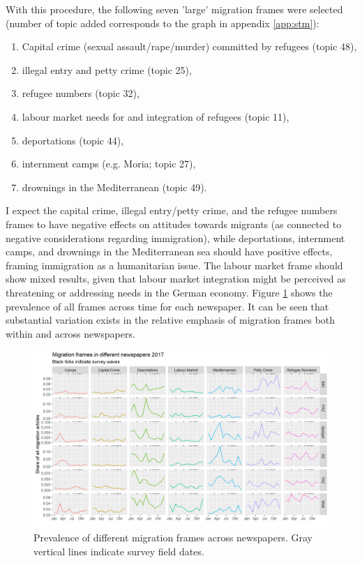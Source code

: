 \documentclass{article}
\begin{document}
With this procedure, the following seven 'large' migration frames were selected (number of topic added corresponds to the graph in appendix \ref{app:stm}):

\begin{enumerate}
    \item Capital crime (sexual assault/rape/murder) committed by refugees (topic 48), 
    \item illegal entry and petty crime (topic 25),
    \item refugee numbers (topic 32),
    \item labour market needs for and integration of refugees (topic 11),
    \item deportations (topic 44),
    \item internment camps (e.g. Moria; topic 27),
    \item drownings in the Mediterranean (topic 49).
\end{enumerate}

I expect the capital crime, illegal entry/petty crime, and the refugee numbers frames to have negative effects on attitudes towards migrants (as connected to negative considerations regarding immigration), while deportations, internment camps, and drownings in the Mediterranean sea should have positive effects, framing immigration as a humanitarian issue. The labour market frame should show mixed results, given that labour market integration might be perceived as threatening or addressing needs in the German economy. Figure \ref{fig:frames} shows the prevalence of all frames across time for each newspaper. It can be seen that substantial variation exists in the relative emphasis of migration frames both within and across newspapers.

\begin{figure}[!ht]
    \centering
    \includegraphics[width=\textwidth]{paper/vis/frames_papers_focus.png}
    \caption{Prevalence of different migration frames across newspapers. Gray vertical lines indicate survey field dates.}
    \label{fig:frames}
\end{figure}
\end{document}
